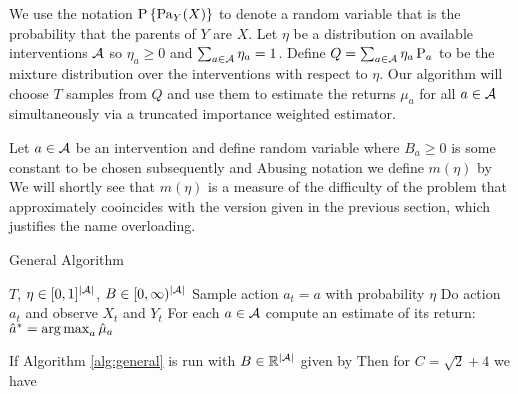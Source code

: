 We use the notation $\operatorname{P}\left\{\operatorname{Pa}_{Y}(X)\right\}$ to denote a random variable that is the probability that the parents of $Y$ are $X$.
Let $\eta$ be a distribution on available interventions $\mathcal A$ so $\eta_a \geq 0$ and $\sum_{a \in \mathcal A} \eta_a = 1$.
Define $Q = \sum_{a \in \mathcal A} \eta_a \operatorname{P}_a$ to be the mixture distribution over the interventions with respect to $\eta$.
Our algorithm will choose $T$ samples from $Q$ and use them to estimate the returns $\mu_a$ for all $a \in \mathcal A$ simultaneously via
a truncated importance weighted estimator.

Let $a \in \mathcal A$ be an intervention and define random variable
where $B_a \geq 0$ is some constant to be chosen subsequently and
Abusing notation we define $m(\eta)$ by
We will shortly see that $m(\eta)$ is a measure of the difficulty of the problem that approximately cooincides 
with the version given in the previous section, which justifies the name overloading.


\begin{algorithm}[H]
\caption{General Algorithm}\label{alg:general}
\begin{algorithmic}
 $T$, $\eta \in [0,1]^{|\mathcal A|}$, $B \in [0,\infty)^{|\mathcal A|}$
\STATE Sample action $a_t = a$ with probability $\eta$
\STATE Do action $a_t$ and observe $X_t$ and $Y_t$
\ENDFOR
\STATE For each $a \in \mathcal A$ compute an estimate of its return:
 $\hat a^* = \argmax_a \hat \mu_a$
\end{algorithmic}
\end{algorithm}

\begin{theorem}\label{thm:general}
If Algorithm \ref{alg:general} is run with $B \in \mathbb R^{|\mathcal A|}$ given by
Then for $C = \sqrt{2} + 4$ we have
\end{theorem}

